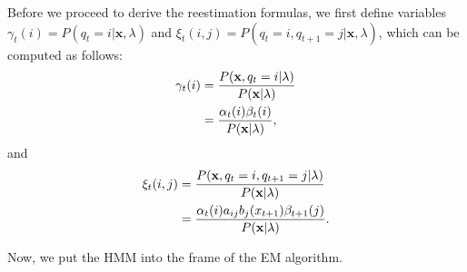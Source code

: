 \documentclass[12pt,final,twoside]{report}
\theoremstyle{plain}
\theoremstyle{definition}
\theoremstyle{remark}
\begin{document}
Before we proceed to derive the reestimation formulas, we first define variables $\gamma_t(i) = P(q_t=i|\mathbf{x},\lambda)$ and $\xi_t(i,j) = P(q_t=i,q_{t+1}=j|\mathbf{x},\lambda)$, which can be computed as follows:
\begin{align}
  \gamma_t(i) &= \frac{P(\mathbf{x},q_t=i|\lambda)}{P(\mathbf{x}|\lambda)} \notag\\
  &= \frac{\alpha_t(i)\beta_t(i)}{P(\mathbf{x}|\lambda)} ,
  \label{eq:hmmgamma}
\end{align}
and
\begin{align}
  \xi_t(i,j) &= \frac{P(\mathbf{x},q_t=i,q_{t+1}=j|\lambda)}{P(\mathbf{x}|\lambda)} \notag\\
  &=  \frac{\alpha_t(i)a_{ij}b_j(x_{t+1})\beta_{t+1}(j)}{P(\mathbf{x}|\lambda)} .
  \label{eq:hmmxi}
\end{align}

Now, we put the HMM into the frame of the EM algorithm.
\end{document}
